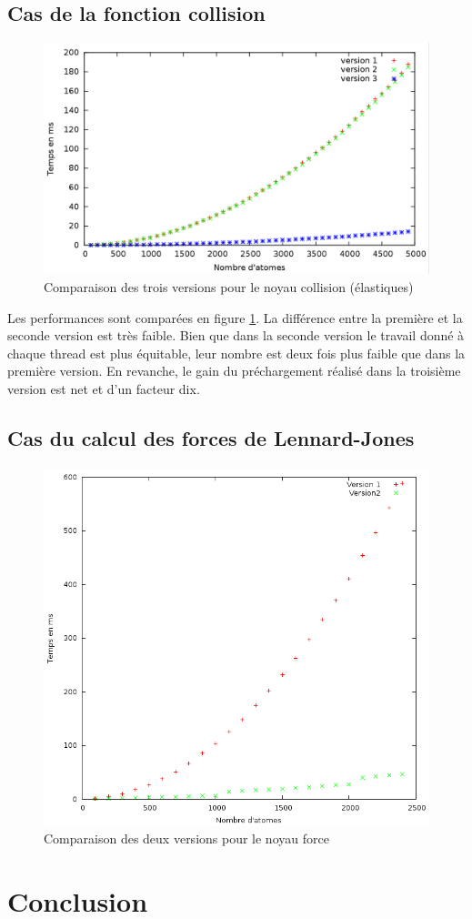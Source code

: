 \documentclass{article}
\begin{document}
\subsection{Cas de la fonction collision}
\begin{figure}[h]
	\includegraphics[width=\textwidth]{figures/collision.png}
	\caption{Comparaison des trois versions pour le noyau collision (élastiques)}
	\label{collisions}
\end{figure}

Les performances sont comparées en figure \ref{collisions}. La différence entre la première et la seconde version est très faible. Bien
que dans la seconde version le travail donné à chaque thread est plus
équitable, leur nombre est deux fois plus faible que dans la première version.
En revanche, le gain du préchargement réalisé dans la troisième version est
net et d'un facteur dix.

\subsection{Cas du calcul des forces de Lennard-Jones}

\begin{figure}[h]
	\includegraphics[width=\textwidth]{figures/lennard.png}
	\caption{Comparaison des deux versions pour le noyau force}
	\label{lennard}
\end{figure}

\section{Conclusion}
\end{document}
